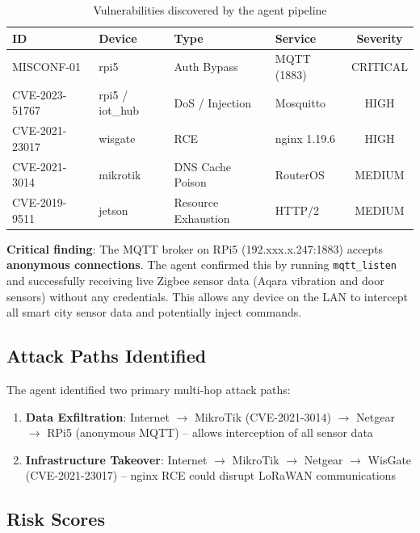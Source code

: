 \documentclass[11pt,a4paper]{article}
\begin{document}
\begin{table}[H]
\centering
\begin{tabular}{@{}llllc@{}}
\toprule
\textbf{ID} & \textbf{Device} & \textbf{Type} & \textbf{Service} & \textbf{Severity} \\
\midrule
MISCONF-01 & rpi5 & Auth Bypass & MQTT (1883) & CRITICAL \\
CVE-2023-51767 & rpi5 / iot\_hub & DoS / Injection & Mosquitto & HIGH \\
CVE-2021-23017 & wisgate & RCE & nginx 1.19.6 & HIGH \\
CVE-2021-3014 & mikrotik & DNS Cache Poison & RouterOS & MEDIUM \\
CVE-2019-9511 & jetson & Resource Exhaustion & HTTP/2 & MEDIUM \\
\bottomrule
\end{tabular}
\caption{Vulnerabilities discovered by the agent pipeline}
\label{tab:vulns}
\end{table}

\textbf{Critical finding}: The MQTT broker on RPi5 (192.xxx.x.247:1883) accepts \textbf{anonymous connections}. The agent confirmed this by running \texttt{mqtt\_listen} and successfully receiving live Zigbee sensor data (Aqara vibration and door sensors) without any credentials. This allows any device on the LAN to intercept all smart city sensor data and potentially inject commands.

\subsection{Attack Paths Identified}

The agent identified two primary multi-hop attack paths:

\begin{enumerate}
    \item \textbf{Data Exfiltration}: Internet $\rightarrow$ MikroTik (CVE-2021-3014) $\rightarrow$ Netgear $\rightarrow$ RPi5 (anonymous MQTT) -- allows interception of all sensor data
    \item \textbf{Infrastructure Takeover}: Internet $\rightarrow$ MikroTik $\rightarrow$ Netgear $\rightarrow$ WisGate (CVE-2021-23017) -- nginx RCE could disrupt LoRaWAN communications
\end{enumerate}

\subsection{Risk Scores}
\end{document}
